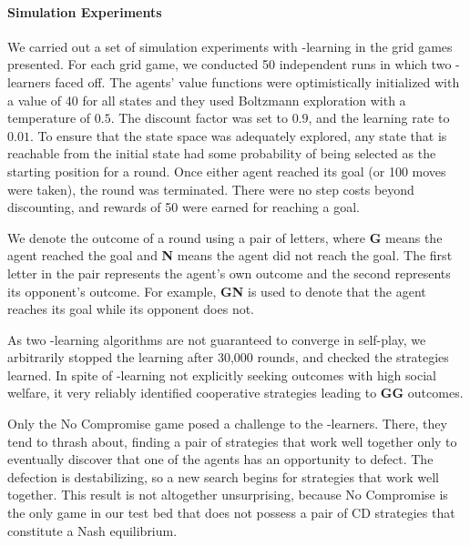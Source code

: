
\vspace{\up}
\paragraph{Simulation Experiments}
\label{sec:qlearning}

We carried out a set of simulation experiments with \Q-learning in
the grid games presented.
%
For each grid game, we conducted 50 independent runs in which two
\Q-learners faced off.  
The agents' value functions were optimistically initialized with a
value of 40 for all states and they used Boltzmann exploration with a
temperature of $0.5$.  The discount factor was set to $0.9$, and the
learning rate to $0.01$.  To ensure that the state space was
adequately explored, any state that is reachable from the initial
state had some probability of being selected as the starting position
for a round.  Once either agent reached its goal (or 100 moves were
taken), the round was terminated.  There were no step costs beyond
discounting, and rewards of 50 were earned for reaching a goal.

We denote the outcome of a round using a pair of letters, where {\bf G} 
means the agent reached the goal and {\bf N} means the agent did not
reach the goal. The first letter in the pair represents the agent's
own outcome and the second represents its opponent's outcome. For
example, {\bf GN} is used to denote that the agent reaches its goal
while its opponent does not.

As two \Q-learning algorithms are not guaranteed to converge in
self-play, we arbitrarily stopped the learning after 30,000 rounds,
and checked the strategies learned.  In spite of \Q-learning not
explicitly seeking outcomes with high social welfare, it very reliably
identified cooperative strategies leading to {\bf GG} outcomes.

Only the No Compromise game posed a challenge to the \Q-learners.
There, they tend to thrash about, finding a pair of strategies that
work well together only to eventually discover that one of the agents
has an opportunity to defect.  The defection is destabilizing, so a
new search begins for strategies that work well together.  This result
is not altogether unsurprising, because No Compromise is the only game
in our test bed that does not possess a pair of CD strategies that
constitute a Nash equilibrium.


